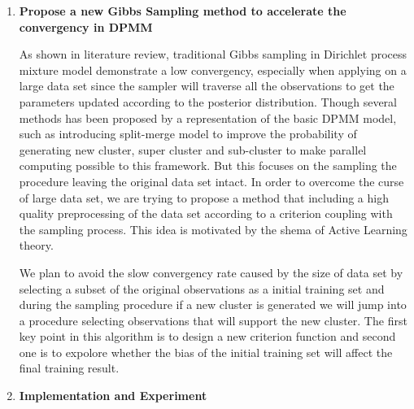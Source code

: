\begin{enumerate}
 \item \textbf{Propose a new Gibbs Sampling method to accelerate the convergency in DPMM}
 
 As shown in literature review, traditional Gibbs sampling in Dirichlet process mixture model demonstrate a low convergency, especially when applying on a large data set since the sampler will traverse all the observations to get the parameters updated according to the posterior distribution. Though several methods has been proposed by a representation of the basic DPMM model, such as introducing split-merge model to improve the probability of generating new cluster, super cluster and sub-cluster to make parallel computing possible to this framework. But this focuses on the sampling the procedure leaving the original data set intact. In order to overcome the curse of large data set, we are trying to propose a method that including a high quality preprocessing of the data set according to a criterion coupling with the sampling process. This idea is motivated by the shema of Active Learning theory. 
 
 We plan to avoid the slow convergency rate caused by the size of data set by selecting a subset of the original observations as a initial training set and during the sampling procedure if a new cluster is generated we will jump into a procedure  selecting observations that will support the new cluster. The first key point in this algorithm is to design a new criterion function and second one is to expolore whether the bias of the initial training set will affect the final training result.
 
 \item \textbf{Implementation and Experiment}
 

\end{enumerate}

